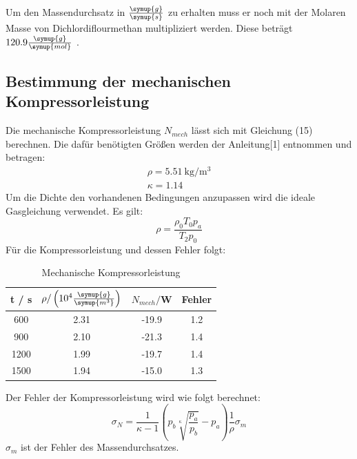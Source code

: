Um den Massendurchsatz in $\frac{\symup{g}}{\symup{s}}$ zu erhalten muss er noch
mit der Molaren Masse von Dichlordiflourmethan multipliziert werden.
Diese beträgt $120.9\frac{\symup{g}}{\symup{mol}}$ \cite{sample4}.
\subsection{Bestimmung der mechanischen Kompressorleistung}
Die mechanische Kompressorleistung $N_{mech}$ lässt sich mit Gleichung (15) berechnen. Die dafür
benötigten Größen werden der Anleitung[1] entnommen und betragen:
\begin{align*}
  \rho = \SI{5.51}{\kilo\gram\per\cubic\meter} \\
  \kappa = 1.14
\end{align*}
Um die Dichte den vorhandenen Bedingungen anzupassen wird die ideale Gasgleichung
verwendet. Es gilt:
\begin{equation}
  \rho = \frac{\rho_0 T_0 p_a}{T_2 p_0}
\end{equation}
Für die Kompressorleistung und dessen Fehler folgt:
\begin{table}
  \centering
  \caption{Mechanische Kompressorleistung}
  \label{tab:Mechanische Kompressorleistung}
  \begin{tabular}{c c c c}
    \toprule
    t / s  &$\rho/\left(10^{4}\frac{\symup{g}}{\symup{m^3}}\right)$ & $N_{mech}/$W & Fehler \\
    \midrule
     600 & 2.31 & -19.9 & 1.2 \\
     900 & 2.10 & -21.3 & 1.4 \\
    1200 & 1.99 & -19.7 & 1.4 \\
    1500 & 1.94 & -15.0 & 1.3 \\
    \bottomrule
  \end{tabular}
\end{table}

Der Fehler der Kompressorleistung wird wie folgt berechnet:
\begin{equation}
  \sigma_N = \frac{1}{\kappa -1} \left(p_b \sqrt[\kappa]{\frac{p_a}{p_b}}-p_a\right)\frac{1}{\rho} \sigma_m
\end{equation}
$\sigma_m$ ist der Fehler des Massendurchsatzes.
